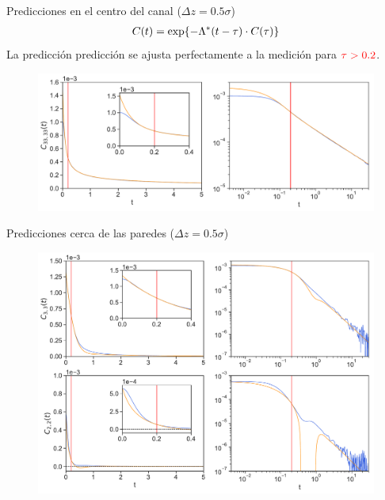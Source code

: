 \documentclass{beamer}
\begin{document}
\begin{frame}{Predicciones en el centro del canal ($\Delta z=0.5\sigma$)}
  \begin{align}
    C(t) = {\rm exp}\{-\Lambda^*(t-\tau)\cdot C(\tau)\}
    \nonumber
  \end{align}
La predicción {\color{orange} predicción} se ajusta perfectamente a la {\color{blue} medición} para ${\color{red}\tau>0.2}$.
  
\begin{figure}[h!]
\includegraphics[width=\linewidth]{Predictions-canal-WALLS-66nodes-defense}
\end{figure}
\end{frame}

\begin{frame}{Predicciones cerca de las paredes ($\Delta z=0.5\sigma$)}
\begin{figure}[h!]
\includegraphics[width=\linewidth]{Predictions-WALLS-66nodes-defense}
\end{figure}
\end{frame}
\end{document}
